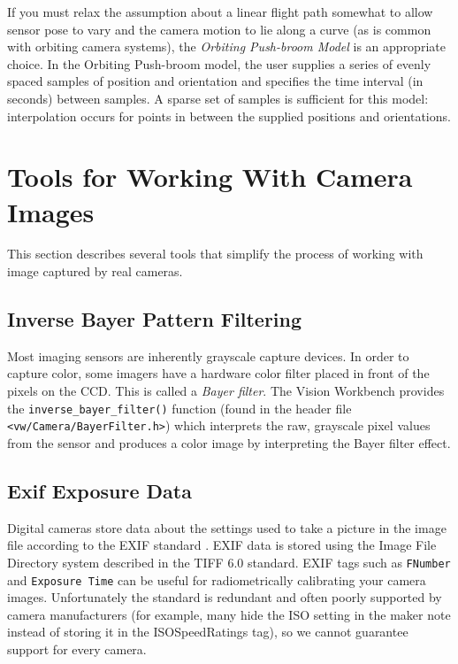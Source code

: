 If you must relax the assumption about a linear flight path somewhat
to allow sensor pose to vary and the camera motion to lie along a
curve (as is common with orbiting camera systems), the {\em Orbiting
  Push-broom Model} is an appropriate choice.  In the Orbiting
Push-broom model, the user supplies a series of evenly spaced samples
of position and orientation and specifies the time interval (in
seconds) between samples.  A sparse set of samples is sufficient for
this model: interpolation occurs for points in between the supplied
positions and orientations.

\section{Tools for Working With Camera Images}

This section describes several tools that simplify the process of
working with image captured by real cameras.

\subsection{Inverse Bayer Pattern Filtering}

Most imaging sensors are inherently grayscale capture devices.  In
order to capture color, some imagers have a hardware color filter
placed in front of the pixels on the CCD.  This is called a 
{\em Bayer filter}.  The Vision Workbench provides the
\verb#inverse_bayer_filter()# function (found in the header file
\verb#<vw/Camera/BayerFilter.h>#) which interprets the raw, grayscale
pixel values from the sensor and produces a color image by
interpreting the Bayer filter effect.

\subsection{Exif Exposure Data}

Digital cameras store data about the settings used to take a picture
in the image file according to the EXIF standard \cite{exif}. EXIF
data is stored using the Image File Directory system described in the
TIFF 6.0 standard.  EXIF tags such as {\tt FNumber} and
{\tt Exposure Time} can be useful for radiometrically calibrating your
camera images.  Unfortunately the standard is redundant and often
poorly supported by camera manufacturers (for example, many hide the
ISO setting in the maker note instead of storing it in the
ISOSpeedRatings tag), so we cannot guarantee support for every camera.


